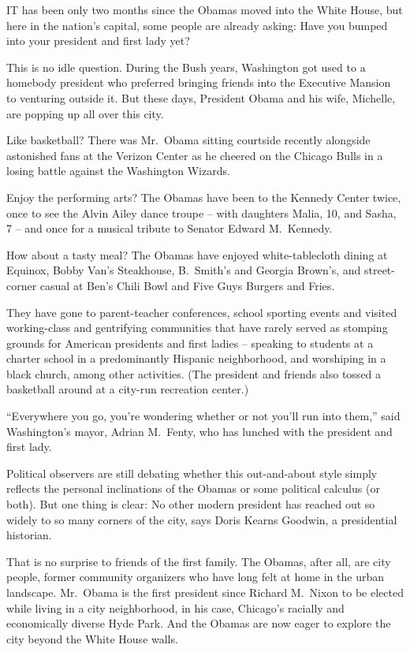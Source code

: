 \documentclass[12pt,a4paper,onecolumn]{article}
\begin{document}
\begin{CJK*}{GBK}{song}
IT has been only two months since the Obamas moved into the White House, but here in the nation's
capital, some people are already asking: Have you bumped into your president and first lady yet?

This is no idle question. During the Bush years, Washington got used to a homebody president who
preferred bringing friends into the Executive Mansion to venturing outside it. But these days,
President Obama and his wife, Michelle, are popping up all over this city.

Like basketball? There was Mr.~Obama sitting courtside recently alongside astonished fans at the
Verizon Center as he cheered on the Chicago Bulls in a losing battle against the Washington Wizards.

Enjoy the performing arts? The Obamas have been to the Kennedy Center twice, once to see the Alvin
Ailey dance troupe -- with daughters Malia, 10, and Sasha, 7 -- and once for a musical tribute to
Senator Edward M.~Kennedy.

How about a tasty meal? The Obamas have enjoyed white-tablecloth dining at Equinox, Bobby Van's
Steakhouse, B.~Smith's and Georgia Brown's, and street-corner casual at Ben's Chili Bowl and Five
Guys Burgers and Fries.

They have gone to parent-teacher conferences, school sporting events and visited working-class and
gentrifying communities that have rarely served as stomping grounds for American presidents and
first ladies -- speaking to students at a charter school in a predominantly Hispanic neighborhood,
and worshiping in a black church, among other activities. (The president and friends also tossed a
basketball around at a city-run recreation center.)

``Everywhere you go, you're wondering whether or not you'll run into them,'' said Washington's
mayor, Adrian M.~Fenty, who has lunched with the president and first lady.

Political observers are still debating whether this out-and-about style simply reflects the personal
inclinations of the Obamas or some political calculus (or both). But one thing is clear: No other
modern president has reached out so widely to so many corners of the city, says Doris Kearns
Goodwin, a presidential historian.

That is no surprise to friends of the first family. The Obamas, after all, are city people, former
community organizers who have long felt at home in the urban landscape. Mr.~Obama is the first
president since Richard M.~Nixon to be elected while living in a city neighborhood, in his case,
Chicago's racially and economically diverse Hyde Park. And the Obamas are now eager to explore the
city beyond the White House walls.


\end{CJK*}
\end{document}
